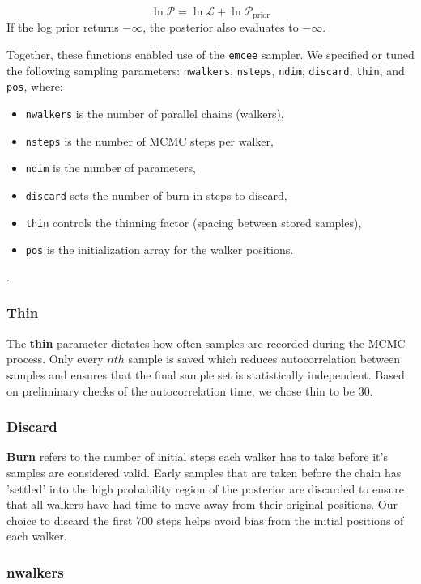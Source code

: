 \documentclass[linenumbers,trackchanges,astrosymb,]{aastex7}
\begin{document}
\[
\ln \mathcal{P} = \ln \mathcal{L} + \ln \mathcal{P}_{\text{prior}}
\]
If the log prior returns $-\infty$, the posterior also evaluates to $-\infty$.

Together, these functions enabled use of the \texttt{emcee} sampler. We specified or tuned the following sampling parameters: \texttt{nwalkers}, \texttt{nsteps}, \texttt{ndim}, \texttt{discard}, \texttt{thin}, and \texttt{pos}, where:
\begin{itemize}
  \item \texttt{nwalkers} is the number of parallel chains (walkers),
  \item \texttt{nsteps} is the number of MCMC steps per walker,
  \item \texttt{ndim} is the number of parameters,
  \item \texttt{discard} sets the number of burn-in steps to discard,
  \item \texttt{thin} controls the thinning factor (spacing between stored samples),
  \item \texttt{pos} is the initialization array for the walker positions.
\end{itemize}.

\subsubsection{Thin}

The \textbf{thin} parameter dictates how often samples are recorded during the MCMC process. Only every $nth$ sample is saved which reduces autocorrelation between samples and ensures that the final sample set is statistically independent. Based on preliminary checks of the autocorrelation time, we chose thin to be $30$. 

\subsubsection{Discard}

\textbf{Burn} refers to the number of initial steps each walker has to take before it's samples are considered valid. Early samples that are taken before the chain has 'settled' into the high probability region of the posterior are discarded to ensure that all walkers have had time to move away from their original positions. Our choice to discard the first $700$ steps helps avoid bias from the initial positions of each walker. 


\subsubsection{nwalkers}
\end{document}
